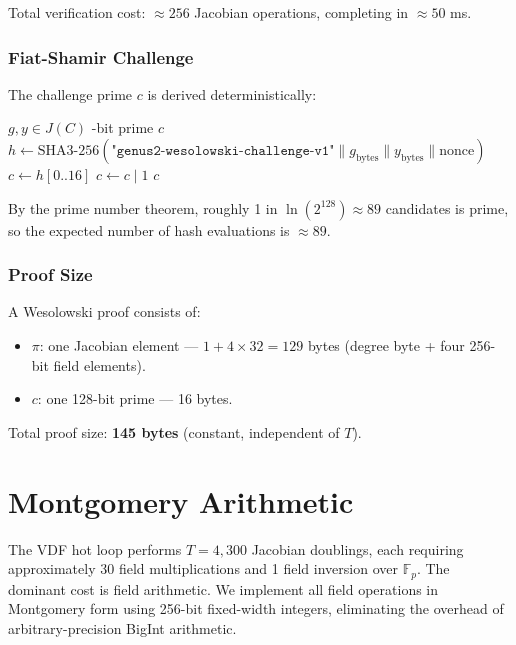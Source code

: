 \documentclass[11pt,a4paper]{article}
\begin{document}
Total verification cost: $\approx 256$ Jacobian operations, completing in $\approx 50$ ms.

\subsubsection{Fiat-Shamir Challenge}

The challenge prime $c$ is derived deterministically:

\begin{algorithm}[H]
\caption{HashToPrime (Fiat-Shamir)}
\label{alg:hash-to-prime}
\begin{algorithmic}[1]
\Require $g, y \in J(C)$
-bit prime $c$
    \State $h \gets \mathrm{SHA3\text{-}256}(\texttt{"genus2-wesolowski-challenge-v1"} \| g_{\mathrm{bytes}} \| y_{\mathrm{bytes}} \| \mathrm{nonce})$
    \State $c \gets h[0..16]$ 
    \State $c \gets c \mid 1$ 
     \Return $c$ \EndIf
\EndFor
\end{algorithmic}
\end{algorithm}

By the prime number theorem, roughly 1 in $\ln(2^{128}) \approx 89$ candidates is prime, so the expected number of hash evaluations is $\approx 89$.

\subsubsection{Proof Size}

A Wesolowski proof consists of:
\begin{itemize}
    \item $\pi$: one Jacobian element --- $1 + 4 \times 32 = 129$ bytes (degree byte + four 256-bit field elements).
    \item $c$: one 128-bit prime --- 16 bytes.
\end{itemize}
Total proof size: \textbf{145 bytes} (constant, independent of $T$).

\section{Montgomery Arithmetic}
\label{sec:montgomery}

The VDF hot loop performs $T = 4{,}300$ Jacobian doublings, each requiring approximately 30 field multiplications and 1 field inversion over $\mathbb{F}_p$. The dominant cost is field arithmetic. We implement all field operations in Montgomery form \cite{montgomery1985} using 256-bit fixed-width integers, eliminating the overhead of arbitrary-precision BigInt arithmetic.
\end{document}

